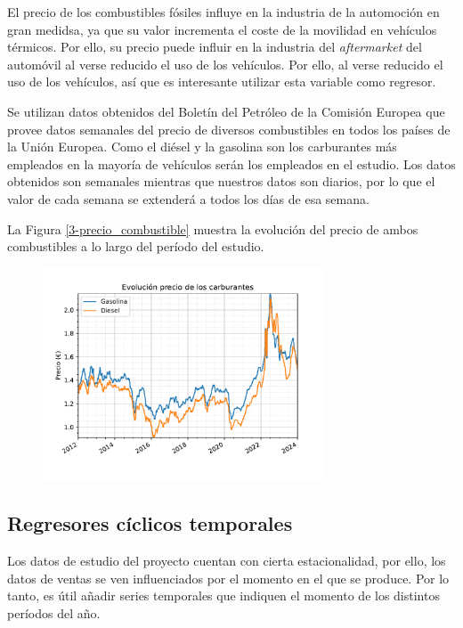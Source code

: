 El precio de los combustibles fósiles influye en la industria de la automoción en gran medidsa, ya que su valor incrementa el coste de la movilidad en vehículos térmicos. Por ello, su precio puede influir en la industria del \textit{aftermarket} del automóvil al verse reducido el uso de los vehículos. Por ello, al verse reducido el uso de los vehículos, así que es interesante utilizar esta variable como regresor.

Se utilizan datos obtenidos del Boletín del Petróleo de la Comisión Europea \cite{petrol} que provee datos semanales del precio de diversos combustibles en todos los países de la Unión Europea. Como el diésel y la gasolina son los carburantes más empleados en la mayoría de vehículos serán los empleados en el estudio. Los datos obtenidos son semanales mientras que nuestros datos son diarios, por lo que el valor de cada semana se extenderá a todos los días de esa semana. 

La Figura \ref*{3-precio_combustible} muestra la evolución del precio de ambos combustibles a lo largo del período del estudio.

\begin{figure}[H]
	{\includegraphics[width=0.75\textwidth]{imagenes/grafica_carburantes.pdf}}
\end{figure}

\subsection{Regresores cíclicos temporales}

Los datos de estudio del proyecto cuentan con cierta estacionalidad, por ello, los datos de ventas se ven influenciados por el momento en el que se produce. Por lo tanto, es útil añadir series temporales que indiquen el momento de los distintos períodos del año.

